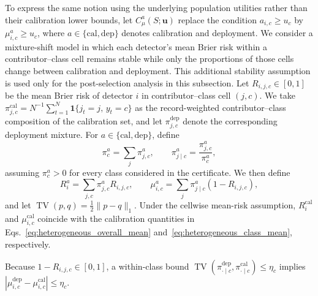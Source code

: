 \documentclass[conference]{IEEEtran}
\theoremstyle{definition}
\begin{document}
To express the same notion using the underlying population utilities rather than their calibration lower bounds, let $C_\mu^a(S;\boldsymbol u)$ replace the condition $a_{i,c}\ge u_c$ by $\mu_{i,c}^a\ge u_c$, where $a\in\{\mathrm{cal},\mathrm{dep}\}$ denotes calibration and deployment.
We consider a mixture-shift model in which each detector's mean Brier risk within a contributor--class cell remains stable while only the proportions of those cells change between calibration and deployment. This additional stability assumption is used only for the post-selection analysis in this subsection.
Let $R_{i,j,c}\in[0,1]$ be the mean Brier risk of detector $i$ in contributor--class cell $(j,c)$. We take $\pi_{j,c}^{\mathrm{cal}}=N^{-1}\sum_{t=1}^{N}\mathbf 1\{j_t=j,\,y_t=c\}$ as the record-weighted contributor--class composition of the calibration set, and let $\pi_{j,c}^{\mathrm{dep}}$ denote the corresponding deployment mixture.
For $a\in\{\mathrm{cal},\mathrm{dep}\}$, define
\begin{equation}
\pi_c^a=\sum_j\pi_{j,c}^a,
\qquad
\pi_{j\mid c}^a=\frac{\pi_{j,c}^a}{\pi_c^a},
\end{equation}
assuming $\pi_c^a>0$ for every class considered in the certificate.
We then define
\begin{equation}
R_i^a=\sum_{j,c}\pi_{j,c}^a R_{i,j,c},
\qquad
\mu_{i,c}^a=\sum_j\pi_{j\mid c}^a(1-R_{i,j,c}),
\label{eq:mixture_quantities}
\end{equation}
and let $\operatorname{TV}(p,q)=\tfrac12\|p-q\|_1$.
Under the cellwise mean-risk assumption, $R_i^{\mathrm{cal}}$ and $\mu_{i,c}^{\mathrm{cal}}$ coincide with the calibration quantities in Eqs.~\ref{eq:heterogeneous_overall_mean} and~\ref{eq:heterogeneous_class_mean}, respectively.

Because $1-R_{i,j,c}\in[0,1]$, a within-class bound
$\operatorname{TV}(\pi_{\cdot\mid c}^{\mathrm{dep}},
\pi_{\cdot\mid c}^{\mathrm{cal}})\le\eta_c$
implies $|\mu_{i,c}^{\mathrm{dep}}-\mu_{i,c}^{\mathrm{cal}}|\le\eta_c$.
\end{document}
